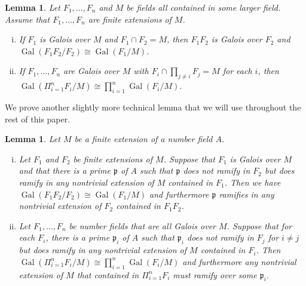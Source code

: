 \documentclass[11pt]{amsart}
\newtheorem{lem}[thm]{Lemma}
\theoremstyle{definition}
\theoremstyle{definition}
\numberwithin{thm}{section}
\numberwithin{equation}{thm}
\newcommand{\fp}{\ensuremath{{\mathfrak{p}}}}
\DeclareMathOperator{\Gal}{Gal}
\begin{document}
\begin{lem}\label{Galois}
Let $F_1,\dots,F_n$ and $M$ be fields all contained in some larger field. Assume that $F_1,\dots,F_n$ are finite extensions of $M$.
\begin{enumerate}[(i)]
\item If $F_1$ is Galois over $M$ and $F_1\cap F_2=M$, then $F_1 F_2$ is Galois over $F_2$ and
$\Gal(F_1 F_2/F_2)\cong\Gal(F_1/M)$.
\item If $F_1,\dots,F_n$ are Galois over $M$ with
  $F_i\cap\prod_{j\neq i}F_j = M$ for each $i$, then $\Gal(\Pi_{i=1}^n
  F_i/M)\cong\prod_{i=1}^n\Gal(F_i/M)$. 
\end{enumerate}
\end{lem}

We prove another slightly more technical lemma that we will use
throughout the rest of this paper.
\begin{lem}\label{Galois2}
  Let $M$ be a finite extension of a number field $A$.
  \begin{enumerate}[(i)]
\item Let $F_1$ and $F_2$ be finite extensions of $M$.  Suppose that
  $F_1$ is Galois over $M$ and that there is a prime $\fp$ of $A$ such
  that $\fp$ does not ramify in $F_2$ but does ramify in any
  nontrivial extension of $M$ contained in $F_1$.  Then we have
  $\Gal(F_1 F_2/F_2) \cong \Gal(F_1/M)$ and furthermore $\fp$
  ramifies in any nontrivial extension of $F_2$ contained in
  $F_1 F_2$.
\item Let $F_1,\dots,F_n$ be number fields that are all Galois
  over $M$.  Suppose that for each
  $F_i$, there is a prime $\fp_i$ of $A$ such that $\fp_i$ does not ramify in
  $F_j$ for $i \not= j$ but does ramify in any nontrivial extension of
  $M$ contained in $F_i$.  Then
  $\Gal(\Pi_{i=1}^n F_i/M)\cong\prod_{i=1}^n\Gal(F_i/M)$ and
  furthermore any nontrivial extension of $M$ that contained in
  $\Pi_{i=1}^n F_i$ must ramify over some $\fp_i$.
  \end{enumerate}
\end{lem}
\end{document}
